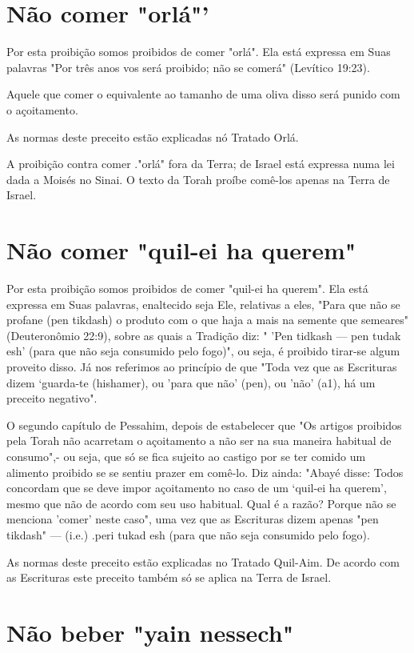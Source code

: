 \begin{itemize}
\begin{enumrate}
\begin{itemize}
\begin{itemize}
\begin{itemize}
\section{Não comer "orlá"'}

Por esta proibição somos proibidos de comer "orlá". Ela está ex­pressa
em Suas palavras "Por três anos vos será proibido; não se comerá"
(Le­vítico 19:23).

Aquele que comer o equivalente ao tamanho de uma oliva disso será punido
com o açoitamento.

As normas deste preceito estão explicadas nó Tratado Orlá.

A proibição contra comer ."orlá" fora da Terra; de Israel está expres­sa
numa lei dada a Moisés no Sinai. O texto da Torah proíbe comê-los apenas
na Terra de Israel.


\section{Não comer "quil-ei ha querem"}

Por esta proibição somos proibidos de comer "quil-ei ha querem". Ela
está expressa em Suas palavras, enaltecido seja Ele, relativas a eles,
"Para que não se profane (pen tikdash) o produto com o que haja a mais
na semente que semeares" (Deuteronômio 22:9), sobre as quais a Tradição
diz: " 'Pen tid­kash --- pen tudak esh' (para que não seja consumido
pelo fogo)", ou seja, é proibido tirar-se algum proveito disso. Já nos
referimos ao princípio de que "To­da vez que as Escrituras dizem
`guarda-te (hishamer), ou 'para que não' (pen), ou 'não' (a1), há um
preceito negativo".

O segundo capítulo de Pessahim, depois de estabelecer que "Os ar­tigos
proibidos pela Torah não acarretam o açoitamento a não ser na sua
ma­neira habitual de consumo",- ou seja, que só se fica sujeito ao
castigo por se ter comido um alimento proibido se se sentiu prazer em
comê-lo. Diz ainda: "Abayé disse: Todos concordam que se deve impor
açoitamento no caso de um `quil-ei ha querem', mesmo que não de acordo
com seu uso habitual. Qual é a razão? Porque não se menciona 'comer'
neste caso", uma vez que as Escri­turas dizem apenas "pen tikdash" ---
(i.e.) .peri tukad esh (para que não seja consumido
pelo fogo).

As normas deste preceito estão explicadas no Tratado Quil-Aim. De acordo
com as Escrituras este preceito também só se aplica na Terra de Israel.

\section{Não beber "yain nessech"}


\end{itemize}
\end{itemize}
\end{itemize}
\end{enumrate}
\end{itemize}
